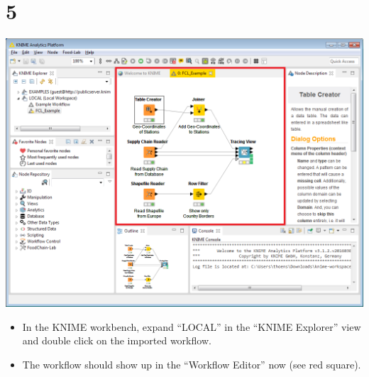 \documentclass[10pt]{beamer}
\begin{document}
\section{5}
\begin{frame}
	\begin{center}
  		\includegraphics[height=0.6\textheight]{5.png}
	\end{center}
	\begin{itemize}
		\item In the KNIME workbench, expand ``LOCAL'' in the ``KNIME Explorer'' view and double click on the imported workflow.
		\item The workflow should show up in the ``Workflow Editor'' now (see red square).
	\end{itemize}
\end{frame}
\end{document}
